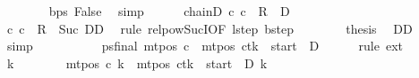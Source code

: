 \begin{isabellebody}
\ \ \ \ \ \ \isamarkupfalse%
\ bps\ False\ \isamarkupfalse%
\ simp\isanewline
\ \ \ \ \isamarkupfalse%
\ chainD{\isacharcolon}{\kern0pt}\ {\isachardoublequoteopen}{\isacharparenleft}{\kern0pt}c{}{\isacharcomma}{\kern0pt}\ c{\isacharprime}{\kern0pt}{\isacharparenright}{\kern0pt}\ {\isasymin}\ {\isacharquery}{\kern0pt}R\ {\isacharcircum}{\kern0pt}{\isacharcircum}{\kern0pt}\ {\isacharquery}{\kern0pt}D{\isachardoublequoteclose}\isanewline
\ \ \ \ \isamarkupfalse%
\ {\isacharminus}{\kern0pt}\isanewline
\ \ \ \ \ \ \isamarkupfalse%
\ {\isachardoublequoteopen}{\isacharparenleft}{\kern0pt}c{}{\isacharcomma}{\kern0pt}\ c{\isacharprime}{\kern0pt}{\isacharparenright}{\kern0pt}\ {\isasymin}\ {\isacharquery}{\kern0pt}R\ {\isacharcircum}{\kern0pt}{\isacharcircum}{\kern0pt}\ Suc\ DD{\isachardoublequoteclose}\ \isamarkupfalse%
\ {\isacharparenleft}{\kern0pt}rule\ relpow{\isacharunderscore}{\kern0pt}Suc{\isacharunderscore}{\kern0pt}I{\isacharbrackleft}{\kern0pt}OF\ lstep\ bstep{\isacharbrackright}{\kern0pt}{\isacharparenright}{\kern0pt}\isanewline
\ \ \ \ \ \ \isamarkupfalse%
\ {\isacharquery}{\kern0pt}thesis\ \isamarkupfalse%
\ DD\ \isamarkupfalse%
\ simp\isanewline
\ \ \ \ \isamarkupfalse%
\isanewline
\ \ \ \ \isamarkupfalse%
\ ps{\isacharunderscore}{\kern0pt}final{\isacharcolon}{\kern0pt}\ {\isachardoublequoteopen}mt{\isacharunderscore}{\kern0pt}pos\ c{\isacharprime}{\kern0pt}\ {\isacharequal}{\kern0pt}\ {\isacharparenleft}{\kern0pt}mt{\isacharunderscore}{\kern0pt}pos\ c{}{\isacharparenright}{\kern0pt}{\isacharparenleft}{\kern0pt}tk\ {\isacharcolon}{\kern0pt}{\isacharequal}{\kern0pt}\ {\isacharquery}{\kern0pt}start\ {\isacharminus}{\kern0pt}\ {\isacharquery}{\kern0pt}D{\isacharparenright}{\kern0pt}{\isachardoublequoteclose}\isanewline
\ \ \ \ \isamarkupfalse%
\ {\isacharparenleft}{\kern0pt}rule\ ext{\isacharparenright}{\kern0pt}\isanewline
\ \ \ \ \ \ \isamarkupfalse%
\ k{\isacharprime}{\kern0pt}\isanewline
\ \ \ \ \ \ \isamarkupfalse%
\ {\isachardoublequoteopen}mt{\isacharunderscore}{\kern0pt}pos\ c{\isacharprime}{\kern0pt}\ k{\isacharprime}{\kern0pt}\ {\isacharequal}{\kern0pt}\ {\isacharparenleft}{\kern0pt}{\isacharparenleft}{\kern0pt}mt{\isacharunderscore}{\kern0pt}pos\ c{}{\isacharparenright}{\kern0pt}{\isacharparenleft}{\kern0pt}tk\ {\isacharcolon}{\kern0pt}{\isacharequal}{\kern0pt}\ {\isacharquery}{\kern0pt}start\ {\isacharminus}{\kern0pt}\ {\isacharquery}{\kern0pt}D{\isacharparenright}{\kern0pt}{\isacharparenright}{\kern0pt}\ k{\isacharprime}{\kern0pt}{\isachardoublequoteclose}\isanewline

\end{isabellebody}
